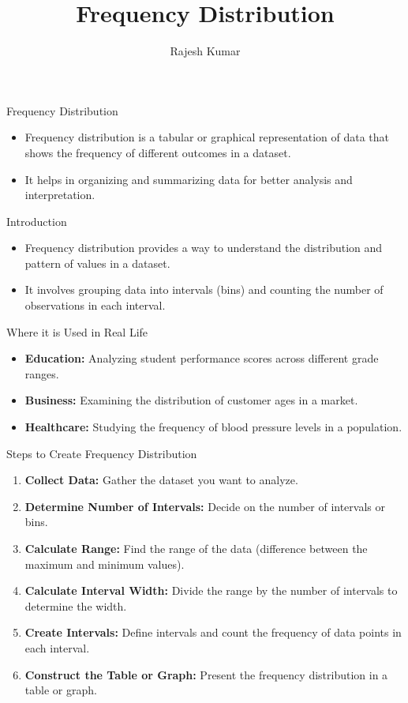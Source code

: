 \title{Frequency Distribution}
\author{Rajesh Kumar}
\date{}

\begin{frame}
  \titlepage
\end{frame}

\begin{frame}{Frequency Distribution}
  \begin{itemize}
    \item Frequency distribution is a tabular or graphical representation of data that shows the frequency of different outcomes in a dataset.
    \item It helps in organizing and summarizing data for better analysis and interpretation.
  \end{itemize}
\end{frame}

\begin{frame}{Introduction}
  \begin{itemize}
    \item Frequency distribution provides a way to understand the distribution and pattern of values in a dataset.
    \item It involves grouping data into intervals (bins) and counting the number of observations in each interval.
  \end{itemize}
\end{frame}

\begin{frame}{Where it is Used in Real Life}
  \begin{itemize}
    \item \textbf{Education:} Analyzing student performance scores across different grade ranges.
    \item \textbf{Business:} Examining the distribution of customer ages in a market.
    \item \textbf{Healthcare:} Studying the frequency of blood pressure levels in a population.
  \end{itemize}
\end{frame}

\begin{frame}{Steps to Create Frequency Distribution}
  \begin{enumerate}
    \item \textbf{Collect Data:} Gather the dataset you want to analyze.
    \item \textbf{Determine Number of Intervals:} Decide on the number of intervals or bins.
    \item \textbf{Calculate Range:} Find the range of the data (difference between the maximum and minimum values).
    \item \textbf{Calculate Interval Width:} Divide the range by the number of intervals to determine the width.
    \item \textbf{Create Intervals:} Define intervals and count the frequency of data points in each interval.
    \item \textbf{Construct the Table or Graph:} Present the frequency distribution in a table or graph.
  \end{enumerate}
\end{frame}

